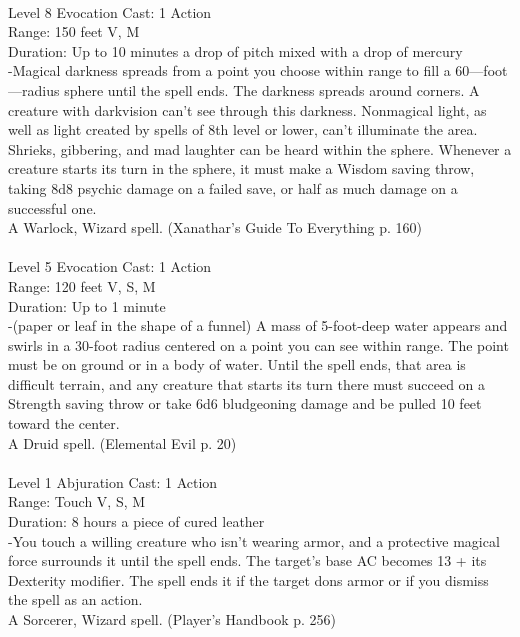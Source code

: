 \documentclass[10pt,twocolumn]{report}
\begin{document}
 \\
Level 8 \quad Evocation \quad Cast: 1 Action\\
Range: 150 feet \quad V, M\\
Duration: Up to 10 minutes \quad a drop of pitch mixed with a drop of mercury\\
-Magical darkness spreads from a point you choose within range to fill a 60—foot—radius sphere until the spell ends. The darkness spreads around corners. A creature with darkvision can’t see through this darkness. Nonmagical light, as well as light created by spells of 8th level or lower, can't illuminate the area. Shrieks, gibbering, and mad laughter can be heard within the sphere. Whenever a creature starts its turn in the sphere, it must make a Wisdom saving throw, taking 8d8 psychic damage on a failed save, or half as much damage on a successful one.\\
A Warlock, Wizard spell. (Xanathar's Guide To Everything p. 160) \\


 \\
Level 5 \quad Evocation \quad Cast: 1 Action\\
Range: 120 feet \quad V, S, M\\
Duration: Up to 1 minute \quad \\
-(paper or leaf in the shape of a funnel)
A mass of 5-foot-deep water appears and swirls in a 30-foot radius centered on a point you can see within range. The point must be on ground or in a body of water. Until the spell ends, that area is difficult terrain, and any creature that starts its turn there must succeed on a Strength saving throw or take 6d6 bludgeoning damage and be pulled 10 feet toward the center.\\
A Druid spell. (Elemental Evil p. 20) \\


 \\
Level 1 \quad Abjuration \quad Cast: 1 Action\\
Range: Touch \quad V, S, M\\
Duration: 8 hours \quad a piece of cured leather\\
-You touch a willing creature who isn’t wearing armor, and a protective magical force surrounds it until the spell ends. The target’s base AC becomes 13 + its Dexterity modifier. The spell ends it if the target dons armor or if you dismiss the spell as an action.\\
A Sorcerer, Wizard spell. (Player's Handbook p. 256) \\
\end{document}

